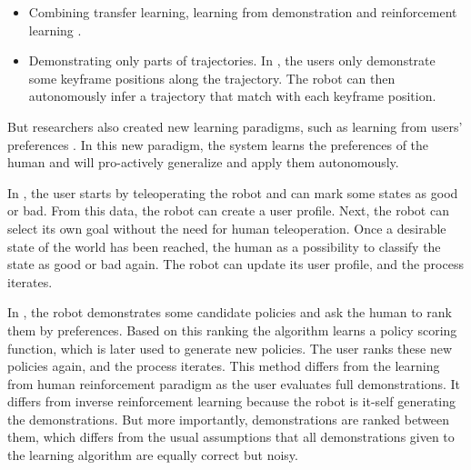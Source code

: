 \begin{itemize}
\item Combining transfer learning, learning from demonstration and reinforcement learning \cite{taylor2011integrating}.

\item Demonstrating only parts of trajectories. In \cite{akgun12hri}, the users only demonstrate some keyframe positions along the trajectory. The robot can then autonomously infer a trajectory that match with each keyframe position.

\end{itemize}

But researchers also created new learning paradigms, such as learning from users' preferences \cite{Mason2011,akrour2011preference}. In this new paradigm, the system learns the preferences of the human and will pro-actively generalize and apply them autonomously. 

In \cite{Mason2011}, the user starts by teleoperating the robot and can mark some states as good or bad. From this data, the robot can create a user profile. Next, the robot can select its own goal without the need for human teleoperation. Once a desirable state of the world has been reached, the human as a possibility to classify the state as good or bad again. The robot can update its user profile, and the process iterates.


In \cite{akrour2011preference,akrour2012april,akrour2014programming,wilson2012bayesian}, the robot demonstrates some candidate policies and ask the human to rank them by preferences. Based on this ranking the algorithm learns a policy scoring function, which is later used to generate new policies. The user ranks these new policies again, and the process iterates. This method differs from the learning from human reinforcement paradigm as the user evaluates full demonstrations. It differs from inverse reinforcement learning because the robot is it-self generating the demonstrations. But more importantly, demonstrations are ranked between them, which differs from the usual assumptions that all demonstrations given to the learning algorithm are equally correct but noisy.


